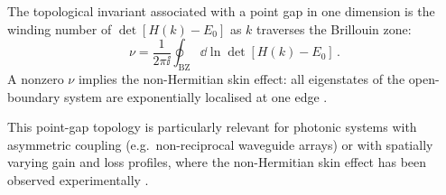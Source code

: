 The topological invariant associated with a point gap in one
dimension is the winding number of $\det[H(k)-E_0]$ as $k$ traverses
the Brillouin zone:
\begin{equation}\label{eq:appB-point-gap-winding}
  \nu = \frac{1}{2\pi\ii}\oint_{\mathrm{BZ}}
  \dd\ln\det[H(k)-E_0]\,.
\end{equation}
A nonzero $\nu$ implies the non-Hermitian skin effect: all
eigenstates of the open-boundary system are exponentially localised
at one edge \cite{okuma2020topological,zhong2021non}.

This point-gap topology is particularly relevant for photonic systems
with asymmetric coupling (e.g.\ non-reciprocal waveguide arrays) or
with spatially varying gain and loss profiles, where the
non-Hermitian skin effect has been observed experimentally
\cite{ding2022non,wang2021topological}.
